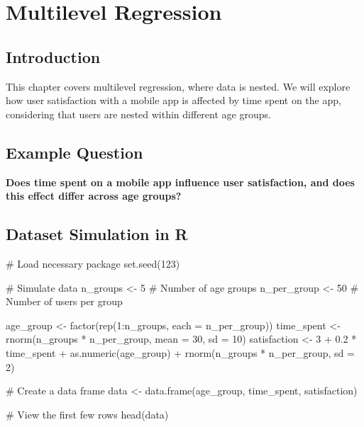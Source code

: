 \documentclass[
  letterpaper,
  DIV=11,
  numbers=noendperiod]{scrreprt}
\newenvironment{Shaded}{\begin{snugshade}}{\end{snugshade}}
\newcommand{\AttributeTok}[1]{\textcolor[rgb]{0.40,0.45,0.13}{#1}}
\newcommand{\CommentTok}[1]{\textcolor[rgb]{0.37,0.37,0.37}{#1}}
\newcommand{\DecValTok}[1]{\textcolor[rgb]{0.68,0.00,0.00}{#1}}
\newcommand{\FloatTok}[1]{\textcolor[rgb]{0.68,0.00,0.00}{#1}}
\newcommand{\FunctionTok}[1]{\textcolor[rgb]{0.28,0.35,0.67}{#1}}
\newcommand{\NormalTok}[1]{\textcolor[rgb]{0.00,0.23,0.31}{#1}}
\newcommand{\OtherTok}[1]{\textcolor[rgb]{0.00,0.23,0.31}{#1}}
\newcommand{\SpecialCharTok}[1]{\textcolor[rgb]{0.37,0.37,0.37}{#1}}
\begin{document}

\chapter{Multilevel Regression}\label{multilevel-regression}

\section{Introduction}\label{introduction-4}

This chapter covers multilevel regression, where data is nested. We will
explore how user satisfaction with a mobile app is affected by time
spent on the app, considering that users are nested within different age
groups.

\section{Example Question}\label{example-question-2}

\textbf{Does time spent on a mobile app influence user satisfaction, and
does this effect differ across age groups?}

\section{Dataset Simulation in R}\label{dataset-simulation-in-r-1}

\begin{Shaded}
\begin{Highlighting}[]
\CommentTok{\# Load necessary package}
\FunctionTok{set.seed}\NormalTok{(}\DecValTok{123}\NormalTok{)}

\CommentTok{\# Simulate data}
\NormalTok{n\_groups }\OtherTok{\textless{}{-}} \DecValTok{5}  \CommentTok{\# Number of age groups}
\NormalTok{n\_per\_group }\OtherTok{\textless{}{-}} \DecValTok{50}  \CommentTok{\# Number of users per group}

\NormalTok{age\_group }\OtherTok{\textless{}{-}} \FunctionTok{factor}\NormalTok{(}\FunctionTok{rep}\NormalTok{(}\DecValTok{1}\SpecialCharTok{:}\NormalTok{n\_groups, }\AttributeTok{each =}\NormalTok{ n\_per\_group))}
\NormalTok{time\_spent }\OtherTok{\textless{}{-}} \FunctionTok{rnorm}\NormalTok{(n\_groups }\SpecialCharTok{*}\NormalTok{ n\_per\_group, }\AttributeTok{mean =} \DecValTok{30}\NormalTok{, }\AttributeTok{sd =} \DecValTok{10}\NormalTok{)}
\NormalTok{satisfaction }\OtherTok{\textless{}{-}} \DecValTok{3} \SpecialCharTok{+} \FloatTok{0.2} \SpecialCharTok{*}\NormalTok{ time\_spent }\SpecialCharTok{+} \FunctionTok{as.numeric}\NormalTok{(age\_group) }\SpecialCharTok{+} \FunctionTok{rnorm}\NormalTok{(n\_groups }\SpecialCharTok{*}\NormalTok{ n\_per\_group, }\AttributeTok{sd =} \DecValTok{2}\NormalTok{)}

\CommentTok{\# Create a data frame}
\NormalTok{data }\OtherTok{\textless{}{-}} \FunctionTok{data.frame}\NormalTok{(age\_group, time\_spent, satisfaction)}

\CommentTok{\# View the first few rows}
\FunctionTok{head}\NormalTok{(data)}
\end{Highlighting}
\end{Shaded}
\end{document}
